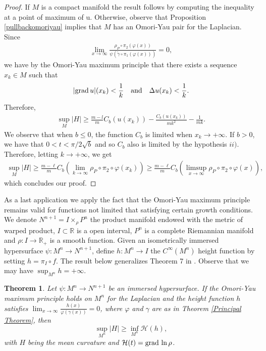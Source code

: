 \documentclass[a4paper]{amsart}
\newtheorem{theorem}{Theorem}
\begin{document}
\begin{proof}
If $ M $ is a compact manifold the result follows by computing the inequality at a point of maximum of u. Otherwise, observe that Proposition \ref{pullbackomoriyau} implies that $ M $ has an Omori-Yau pair for the Laplacian. Since 
\begin{eqnarray*}
\displaystyle{\lim_{x \rightarrow \infty}\frac{\rho_{P}\circ \pi_{2}(\varphi(x))}{\psi(\tilde{\gamma}\circ \pi_{1}(\varphi(x)))}} = 0 ,
\end{eqnarray*}
we have by the Omori-Yau maximum principle that there exists a sequence $ x_k \in M $ such that 
\begin{eqnarray*}
\vert {{{\rm{grad}\,}}} u\vert(x_k) < \frac{1}{k} \ \ \ \mbox{and} \ \ \ \Delta u(x_k) < \frac{1}{k}.
\end{eqnarray*}
Therefore,
\begin{eqnarray}
\sup_{M}\vert H\vert \geq \frac{m-l}{m}C_{b}(u(x_k)) - \frac{C_{b}(u(x_k))}{mk^2} - \frac{1}{mk}.
\end{eqnarray}
We observe that when $ b \leq 0 $, the function $ C_{b} $ is limited when $ x_k \to +\infty $. If $ b > 0 $, we have that $ 0 < t < \pi/2\sqrt{b} $ and so $ C_{b} $ also is limited by the hypothesis $ ii) $. Therefore, letting $ k \to +\infty $, we get
\begin{eqnarray*}
\sup_{M}\vert H\vert \geq \frac{m-\ell}{m}C_{b}(\lim_{k\to \infty}\rho_{P}\circ \pi_{2}\circ \varphi (x_{k}))\geq  \frac{m-\ell}{m}C_{b}(\limsup_{x\to \infty}\rho_{P}\circ \pi_{2}\circ \varphi (x)),
\end{eqnarray*}
which concludes our proof.
\end{proof}

As a last application we apply the fact that the Omori-Yau maximum principle remains valid for functions not limited that satisfying certain growth conditions. We denote $ N^{n+1} = I\times_{\rho}P^n $ the product manifold endowed with the metric of warped product, $ I \subset \mathbb{R} $ is a open interval, $ P^n $ is a complete Riemannian manifold and $ \rho : I \to \mathbb{R}_{+} $ is a smooth function. Given an isometrically immersed hypersurface  $ \psi : M^{n} \to N^{n+1} $, define $ h : M^{n} \to I $ the $ C^{\infty}(M^{n}) $ height function by setting $ h = \pi_{I}\circ f $. The result below generalizes Theorem 7 in \cite{alias-impera-rigoli}. Observe that we may have $ \sup_{M^n}h =  + \infty $.

\begin{theorem}\label{hypersufacetheorem} Let $ \psi : M^{n} \to N^{n+1} $ be an immersed hypersurface. If the Omori-Yau maximum principle holds on $ M^n $ for the Laplacian and the height function $ h $ satisfies 
$
\displaystyle{\lim_{x \rightarrow \infty}\frac{h(x)}{\varphi(\gamma(x))}} = 0 
$, where $ \varphi $ and $ \gamma $ are as in Theorem \ref{Principal Theorem}, then
\begin{equation}
\sup_{M^n}\vert H \vert \geq \inf_{M^n}\mathcal{H}(h) ,
\end{equation}
with $ H $ being the mean curvature and $ \displaystyle{\mathcal{H}(t) = {{{\rm{grad}\,}}} \ln \rho} $.
\end{theorem}
\end{document}
